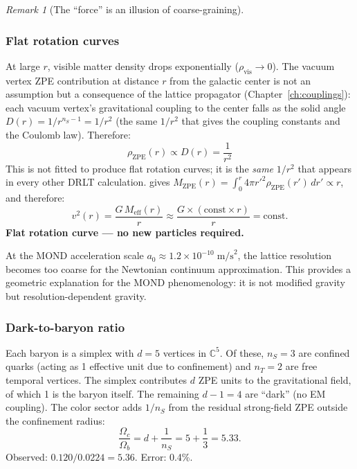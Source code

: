 \documentclass[12pt]{article}
\theoremstyle{remark}
\newtheorem{remark}[theorem]{Remark}
\theoremstyle{definition}
\newcommand{\CC}{\mathbb{C}}
\begin{document}
\begin{remark}[The ``force'' is an illusion of coarse-graining]
\subsubsection{Flat rotation curves}

At large $r$, visible matter density drops exponentially ($\rho_\text{vis} \to 0$). The vacuum vertex ZPE contribution at distance $r$ from the galactic center is not an assumption but a consequence of the lattice propagator (Chapter~\ref{ch:couplings}): each vacuum vertex's gravitational coupling to the center falls as the solid angle $D(r) = 1/r^{n_S - 1} = 1/r^2$ (the same $1/r^2$ that gives the coupling constants and the Coulomb law). Therefore:
\begin{equation}
\rho_\text{ZPE}(r) \propto D(r) = \frac{1}{r^2}
\end{equation}
This is not fitted to produce flat rotation curves; it is the \emph{same} $1/r^2$ that appears in every other DRLT calculation.
gives $M_\text{ZPE}(r) = \int_0^r 4\pi r'^2 \rho_\text{ZPE}(r')\,dr' \propto r$, and therefore:
\begin{equation}
v^2(r) = \frac{G\,M_\text{eff}(r)}{r} \approx \frac{G \times (\text{const}\times r)}{r} = \text{const}.
\end{equation}
\textbf{Flat rotation curve --- no new particles required.}

At the MOND acceleration scale $a_0 \approx 1.2 \times 10^{-10}\;\text{m/s}^2$, the lattice resolution becomes too coarse for the Newtonian continuum approximation. This provides a geometric explanation for the MOND phenomenology: it is not modified gravity but resolution-dependent gravity.

\subsubsection{Dark-to-baryon ratio}

Each baryon is a simplex with $d = 5$ vertices in $\CC^5$. Of these, $n_S = 3$ are confined quarks (acting as 1 effective unit due to confinement) and $n_T = 2$ are free temporal vertices. The simplex contributes $d$ ZPE units to the gravitational field, of which 1 is the baryon itself. The remaining $d - 1 = 4$ are ``dark'' (no EM coupling). The color sector adds $1/n_S$ from the residual strong-field ZPE outside the confinement radius:
\begin{equation}
\frac{\Omega_c}{\Omega_b} = d + \frac{1}{n_S} = 5 + \frac{1}{3} = 5.33.
\end{equation}
Observed: $0.120/0.0224 = 5.36$. Error: 0.4\%.


\end{remark}
\end{document}
